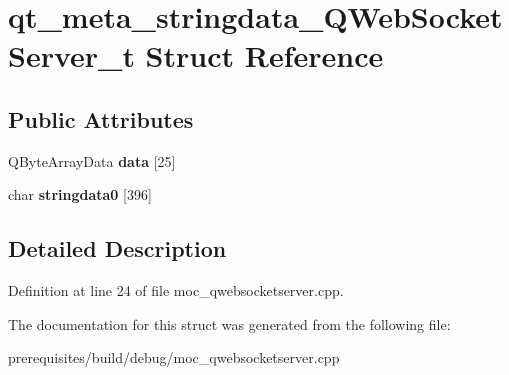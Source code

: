 \hypertarget{structqt__meta__stringdata___q_web_socket_server__t}{}\section{qt\+\_\+meta\+\_\+stringdata\+\_\+\+Q\+Web\+Socket\+Server\+\_\+t Struct Reference}
\label{structqt__meta__stringdata___q_web_socket_server__t}
\subsection*{Public Attributes}
\begin{DoxyCompactItemize}
\item 
\mbox{\label{structqt__meta__stringdata___q_web_socket_server__t_a5fd356bdbfeb21a0b374235cad781364}} 
Q\+Byte\+Array\+Data {\bfseries data} \mbox{[}25\mbox{]}
\item 
\mbox{\label{structqt__meta__stringdata___q_web_socket_server__t_a2e77de14e7a15227d35fafffd6080283}} 
char {\bfseries stringdata0} \mbox{[}396\mbox{]}
\end{DoxyCompactItemize}


\subsection{Detailed Description}


Definition at line 24 of file moc\+\_\+qwebsocketserver.\+cpp.



The documentation for this struct was generated from the following file\+:\begin{DoxyCompactItemize}
\item 
prerequisites/build/debug/moc\+\_\+qwebsocketserver.\+cpp\end{DoxyCompactItemize}
